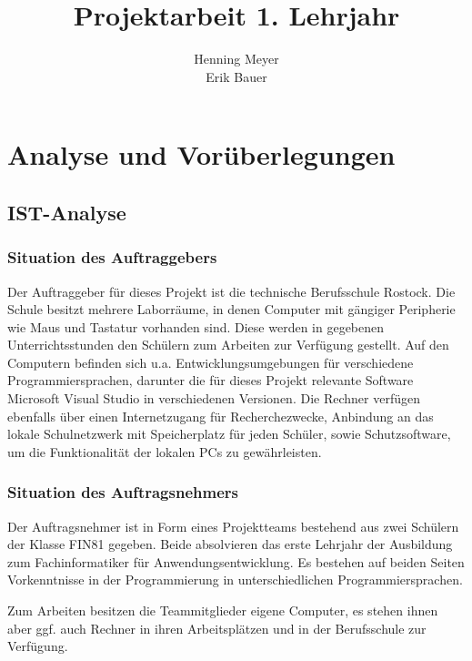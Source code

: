 \documentclass{article}
\title{Projektarbeit 1. Lehrjahr}
\author{Henning Meyer\\Erik Bauer}
\begin{document}

\maketitle
\newpage
\tableofcontents
\newpage


\section{Analyse und Vorüberlegungen}

\subsection{IST-Analyse}

\subsubsection{Situation des Auftraggebers}

    Der Auftraggeber für dieses Projekt ist die technische Berufsschule Rostock.
    Die Schule besitzt mehrere Laborräume, in denen Computer mit gängiger Peripherie wie Maus und Tastatur vorhanden sind.
    Diese werden in gegebenen Unterrichtsstunden den Schülern zum Arbeiten zur Verfügung gestellt.
    Auf den Computern befinden sich u.a. Entwicklungsumgebungen für verschiedene Programmiersprachen, darunter die für dieses Projekt relevante Software \glqq Microsoft Visual Studio\grqq{} in verschiedenen Versionen.
    Die Rechner verfügen ebenfalls über einen Internetzugang für Recherchezwecke, Anbindung an das lokale Schulnetzwerk mit Speicherplatz für jeden Schüler, sowie Schutzsoftware, um die Funktionalität der lokalen PCs zu gewährleisten.

\subsubsection{Situation des Auftragsnehmers}

    Der Auftragsnehmer ist in Form eines Projektteams bestehend aus zwei Schülern der Klasse FIN81 gegeben.
    Beide absolvieren das erste Lehrjahr der Ausbildung zum Fachinformatiker für Anwendungsentwicklung.
    Es bestehen auf beiden Seiten Vorkenntnisse in der Programmierung in unterschiedlichen Programmiersprachen.

    Zum Arbeiten besitzen die Teammitglieder eigene Computer, es stehen ihnen aber ggf. auch Rechner in ihren Arbeitsplätzen und in der Berufsschule zur Verfügung.
\end{document}
